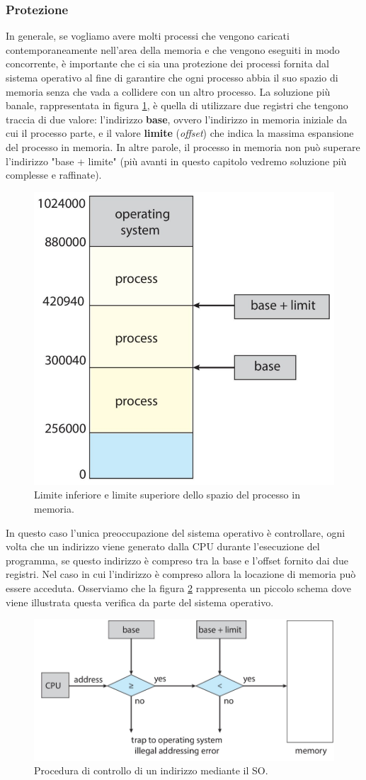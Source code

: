 % 
\subsubsection{Protezione}
In generale, se vogliamo avere molti processi che vengono caricati contemporaneamente nell'area della memoria e che vengono eseguiti in modo concorrente, è importante che ci sia una protezione dei processi fornita dal sistema operativo al fine di garantire che ogni processo abbia il suo spazio di memoria senza che vada a collidere con un altro processo. La soluzione più banale, rappresentata in figura \ref{fig:process_protection}, è quella di utilizzare due registri che tengono traccia di due valore: l'indirizzo \textbf{base}, ovvero l'indirizzo in memoria iniziale da cui il processo parte, e il valore \textbf{limite} (\textit{offset}) che indica la massima espansione del processo in memoria. In altre parole, il processo in memoria non può superare l'indirizzo "base + limite" (più avanti in questo capitolo vedremo soluzione più complesse e raffinate).
\begin{figure}[h]
    \centering
    \includegraphics[width = .35\textwidth]{../res/imgs/main memory/process_protection.png}
    \caption{Limite inferiore e limite superiore dello spazio del processo in memoria.}
    \label{fig:process_protection}
\end{figure}
In questo caso l'unica preoccupazione del sistema operativo è controllare, ogni volta che un indirizzo viene generato dalla CPU durante l'esecuzione del programma, se questo indirizzo è compreso tra la base e l'offset fornito dai due registri. Nel caso in cui l'indirizzo è compreso allora la locazione di memoria può essere acceduta. Osserviamo che la figura \ref{fig:can_access} rappresenta un piccolo schema dove viene illustrata questa verifica da parte del sistema operativo.
\begin{figure}[h]
    \centering
    \includegraphics[width = .6\textwidth]{../res/imgs/main memory/can_access.png}
    \caption{Procedura di controllo di un indirizzo mediante il SO.}
    \label{fig:can_access}
\end{figure}

